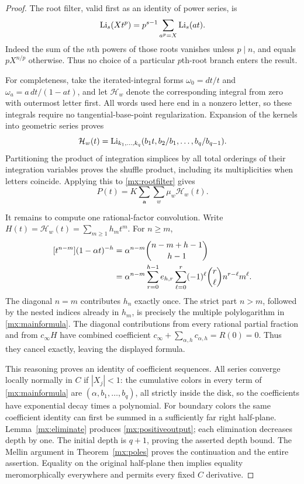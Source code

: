 \begin{proof}
The root filter, valid first as an identity of power series, is
\begin{equation}\label{mx:rootfilter}
 \operatorname{Li}_s(Xt^p)=p^{s-1}\sum_{a^p=X}\operatorname{Li}_s(at).
\end{equation}
Indeed the sum of the $n$th powers of those roots vanishes unless
$p\mid n$, and equals $pX^{n/p}$ otherwise.  Thus no choice of a
particular $p$th-root branch enters the result.

For completeness, take the iterated-integral forms
$\omega_0=dt/t$ and $\omega_a=a\,dt/(1-at)$, and let
$\mathcal H_w$ denote the corresponding integral from zero with
outermost letter first.  All words used here end in a nonzero letter,
so these integrals require no tangential-base-point regularization.
Expansion of the kernels into geometric series proves
\begin{equation}\label{mx:hyperlog}
 \mathcal H_w(t)=
 \operatorname{Li}_{k_1,\ldots,k_q}
       (b_1t,b_2/b_1,\ldots,b_q/b_{q-1}).
\end{equation}
Partitioning the product of integration simplices by all total
orderings of their integration variables proves the shuffle product,
including its multiplicities when letters coincide.  Applying this
to \eqref{mx:rootfilter} gives
\[
 P(t)=K\sum_{\mathbf a}\sum_w\mu_w\mathcal H_w(t).
\]

It remains to compute one rational-factor convolution.  Write
$H(t)=\mathcal H_w(t)=\sum_{m\geq1}h_mt^m$.  For $n\geq m$,
\begin{align}\label{mx:binomial}
 [t^{n-m}](1-\alpha t)^{-h}
 &=\alpha^{n-m}\binom{n-m+h-1}{h-1}\notag\\
 &=\alpha^{n-m}\sum_{r=0}^{h-1}e_{h,r}
                   \sum_{\ell=0}^r(-1)^\ell\binom r\ell
                            n^{r-\ell}m^\ell.
\end{align}
The diagonal $n=m$ contributes $h_n$ exactly once.  The strict part
$n>m$, followed by the nested indices already in $h_m$, is precisely
the multiple polylogarithm in \eqref{mx:mainformula}.  The diagonal
contributions from every rational partial fraction and from
$c_\infty H$ have combined coefficient
$c_\infty+\sum_{\alpha,h}c_{\alpha,h}=R(0)=0$.  Thus they cancel
exactly, leaving the displayed formula.

This reasoning proves an identity of coefficient sequences.  All
series converge locally normally in $C$ if $|X_j|<1$: the cumulative
colors in every term of \eqref{mx:mainformula} are
$(\alpha,b_1,\ldots,b_q)$, all strictly inside the disk, so the
coefficients have exponential decay times a polynomial.  For boundary
colors the same coefficient identity can first be summed in a
sufficiently far right half-plane.  Lemma~\ref{mx:eliminate} produces
\eqref{mx:positiveoutput}; each elimination decreases depth by one.
The initial depth is $q+1$, proving the asserted depth bound.
The Mellin argument in Theorem~\ref{mx:poles} proves the continuation
and the entire assertion.  Equality on the original half-plane then
implies equality meromorphically everywhere and permits every fixed
$C$ derivative.
\end{proof}

